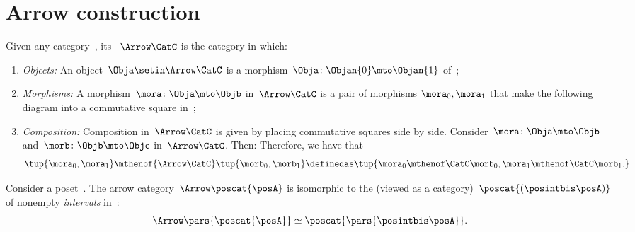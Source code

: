 
\section{Arrow construction}


\begin{ctdefinition}
    \label{def:arrow_category}
    Given any category~\CatC, its ~$\Arrow\CatC$ is the category in which:
    \begin{enumerate}
        \item \emph{Objects:} An object~$\Obja \setin \Arrow\CatC$ is a morphism~$\Obja\colon \Objan{0}\mto \Objan{1}$ of~\CatC;
        \item \emph{Morphisms:} A morphism~$\mora\colon \Obja \mto \Objb$ in~$\Arrow\CatC$ is a pair of morphisms $\mora_0,\mora_1$ that make the following diagram into a commutative square in~\CatC;
        \item \emph{Composition:} Composition in~$\Arrow \CatC$ is given by placing commutative squares side by side.
              Consider~$\mora\colon \Obja \mto \Objb$ and~$\morb\colon \Objb \mto \Objc$ in~$\Arrow\CatC$.
              Then:
              Therefore, we have that
              \begin{equation}\label{eq:arrow-cat-composition}
                  \tup{\mora_0,\mora_1} \mthenof{\Arrow \CatC} \tup{\morb_0,\morb_1}
                  \definedas \tup{\mora_0\mthenof\CatC\morb_0, \mora_1\mthenof\CatC\morb_1.
                  }
              \end{equation}
    \end{enumerate}
\end{ctdefinition}

\begin{example}[Intervals]
    \label{exa:arrow-poset}
    Consider a poset~\posA.
    The arrow category~$\Arrow \poscat{\posA}$ is isomorphic to the  (viewed as a category)~$\poscat{\left(\posintbis\posA\right)}$ of nonempty \emph{intervals} in~\posA:
    \begin{equation}
        \Arrow \pars{\poscat{\posA}} \simeq
        \poscat{\pars{\posintbis\posA}}.
    \end{equation}
\end{example}


